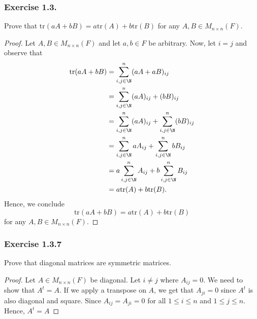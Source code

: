 \subsubsection{Exercise 1.3.}

Prove that \( \text{tr}(aA + bB) = a \text{tr}(A) + b \text{tr}(B) \) for any \( A,B \in M_{n \times n }(F) \).

\begin{proof}
Let \( A , B \in M_{n \times n }(F) \) and let \( a,b \in F  \) be arbitrary.  Now, let \( i = j  \) and observe that 
\begin{align*}
    \text{tr}(aA + bB) &= \sum_{ i,j \in \N  }^{ n  } (aA + aB )_{ij} \\
                       &= \sum_{ i,j \in \N  }^{ n  } (aA)_{ij} + (bB)_{ij} \\
                       &= \sum_{ i,j \in \N  }^{ n  } (aA)_{ij} + \sum_{ i,j \in \N  }^{ n  } (bB)_{ij} \\
                       &= \sum_{ i,j \in \N  }^{ n  } a A_{ij} + \sum_{ i,j \in \N  }^{ n  } b B_{ij} \\
                       &= a \sum_{ i,j \in \N  }^{ n  } A_{ij} + b \sum_{ i,j \in \N  }^{ n } B_{ij} \\
                       &= a \text{tr}(A) + b \text{tr}(B).
\end{align*}
Hence, we conclude 
\[  \text{tr}(aA + bB ) = a \text{tr}(A) + b \text{tr}(B) \]
for any \( A, B \in M_{n \times n }(F ) \).
\end{proof}

\subsubsection{Exercise 1.3.7} 
Prove that diagonal matrices are symmetric matrices.

\begin{proof}
Let \( A \in M_{n \times n }(F) \) be diagonal. Let \( i \neq  j  \) where \( A_{ij} = 0  \). We need to show that \( A^{t} = A  \). If we apply a transpose on \( A  \), we get that \( A_{ji} = 0  \) since \( A^{t}   \) is also diagonal and square. Since \( A_{ij} = A_{ji} = 0  \) for all \( 1 \leq i \leq n  \) and \( 1 \leq j \leq n  \). Hence,  \( A^{t} = A \)
\end{proof}


